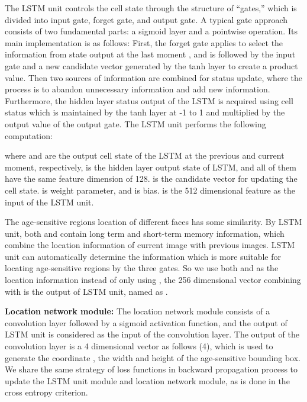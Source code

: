 \documentclass[journal]{IEEEtran}
\begin{document}
\par
The LSTM unit controls the cell state through the structure of ``gates,'' which is divided into input gate, forget gate, and output gate. A typical gate approach consists of two fundamental parts: a sigmoid layer and a pointwise operation. Its main implementation is as follows: First, the forget gate applies to select the information from state output at the last moment , and is followed by the input gate and a new candidate vector  generated by the tanh layer to create a product value. Then two sources of information are combined for status update, where the process is to abandon unnecessary information and add new information. Furthermore, the hidden layer status output of the LSTM is acquired using cell status which is maintained by the tanh layer at -1 to 1 and multiplied by the output value of the output gate. The LSTM unit performs the following computation:

where  and  are the output cell state of the LSTM at the previous and current moment, respectively,  is the hidden layer output state of LSTM, and all of them have the same feature dimension of 128.  is the candidate vector for updating the cell state.  is weight parameter, and  is bias.  is the 512 dimensional feature as the input of the LSTM unit.
\par
The age-sensitive regions location of different faces has some similarity. By LSTM unit, both  and  contain long term and short-term memory information, which combine the location information of current image with previous images. LSTM unit can automatically determine the information which is more suitable for locating age-sensitive regions by the three gates. So we use both  and  as the location information instead of only using , the 256 dimensional vector combining  with  is the output of LSTM unit, named as .
\par
\textbf{Location network module:} The location network module consists of a convolution layer followed by a sigmoid activation function, and the output  of LSTM unit is considered as the input of the convolution layer. The output of the convolution layer is a 4 dimensional vector  as follows (4), which is used to generate the coordinate , the width and height of the age-sensitive bounding box. We share the same strategy of loss functions in backward propagation process to update the LSTM unit module and location network module, as is done in the cross entropy criterion.
\end{document}
